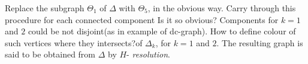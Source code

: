 \documentclass[a4paper,12pt]{article}
\newcommand{\D}{\Delta }
\newcommand{\T}{\Theta }
\numberwithin{equation}{section}
\numberwithin{figure}{section}
\begin{document}

Replace the subgraph $\T_1$ of $\D$ with $\T_5$, in the obvious
way. Carry through this procedure for each connected component
{\ef Is it so obvious? Components for $k=1$ and $2$ could be not
disjoint(as in example of dc-graph). How to define colour of such
vertices where they intersects?}of $\D_k$, for $k=1$ and $2$. The
resulting graph is said to be obtained from $\D$ by $H$-{\em
resolution}.
\end{document}
